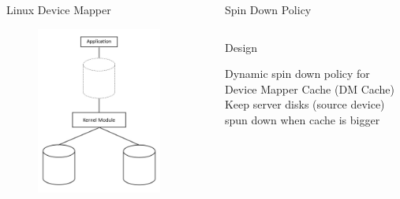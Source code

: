 \documentclass[final]{beamer}
\newlength{\sepwid}
\newlength{\onecolwid}
\newlength{\twocolwid}
\begin{document}
\begin{frame}[t]
\begin{columns}[t]
\begin{column}{\onecolwid}
\begin{block}{Linux Device Mapper}
\begin{figure}
	            \centering \includegraphics[scale=1]{DM.jpg}
	            \label{fig:dm}
	        \end{figure} %
	    \end{block}
	\end{column}
	\begin{column}{\sepwid}\end{column}
	\begin{column}{\twocolwid}
	    \begin{alertblock}{Spin Down Policy}
		\begin{column}{\onecolwid}
		    \begin{block}{Design}
			\raggedright Dynamic spin down policy for Device Mapper Cache (DM Cache)
			    Keep server disks (source device) spun down when cache is bigger \\

\end{block}
\end{column}
\end{alertblock}
\end{column}
\end{columns}
\end{frame}
\end{document}
